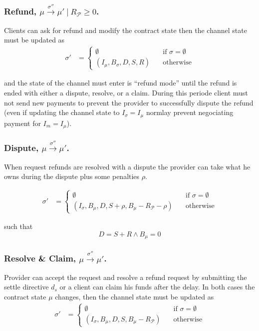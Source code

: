 \documentclass{llncs}
\begin{document}
\subsubsection{Refund, $\mu \xrightarrow{\sigma''} \mu'\ |\ R_\mathcal{P} \geq 0$.} Clients can ask for refund and modify the contract state then the channel state must be updated as
\begin{equation*}
\begin{split}
  \sigma' &=
  \begin{cases}
      \emptyset & \quad \text{if } \sigma = \emptyset \\
      (I_\mu, B_\sigma, D, S, R) & \quad \text{otherwise}
  \end{cases}
\end{split}
\end{equation*}

and the state of the channel must enter is ``refund mode'' until the refund is ended with either a dispute, resolve, or a claim. During this periode client must not send new payments to prevent the provider to successfully dispute the refund (even if updating the channel state to $I_\sigma = I_\mu$ normlay prevent negociating payment for $I_m = I_\mu$).

\subsubsection{Dispute, $\mu \xrightarrow{\sigma''} \mu'$.} When request refunds are resolved with a dispute the provider can take what he owns during the dispute plus some penalties $\rho$.

\begin{equation*}
\begin{split}
  \sigma' &=
  \begin{cases}
      \emptyset & \quad \text{if } \sigma = \emptyset \\
      (I_\sigma, B_\mu, D, S + \rho, B_\mu - R_\mathcal{P} - \rho) & \quad \text{otherwise}
  \end{cases}
\end{split}
\end{equation*}

such that
$$D = S + R \land B_\mu = 0$$

\subsubsection{Resolve \& Claim, $\mu \xrightarrow{\sigma''} \mu'$.} Provider can accept the request and resolve a refund request by submitting the settle directive $d_s$ or a client can claim his funds after the delay. In both cases the contract state $\mu$ changes, then the channel state must be updated as
\begin{equation*}
\begin{split}
  \sigma' &=
  \begin{cases}
      \emptyset & \quad \text{if } \sigma = \emptyset \\
      (I_\sigma, B_\mu, D, S, B_\mu - R_\mathcal{P}) & \quad \text{otherwise}
  \end{cases}
\end{split}
\end{equation*}
\end{document}
